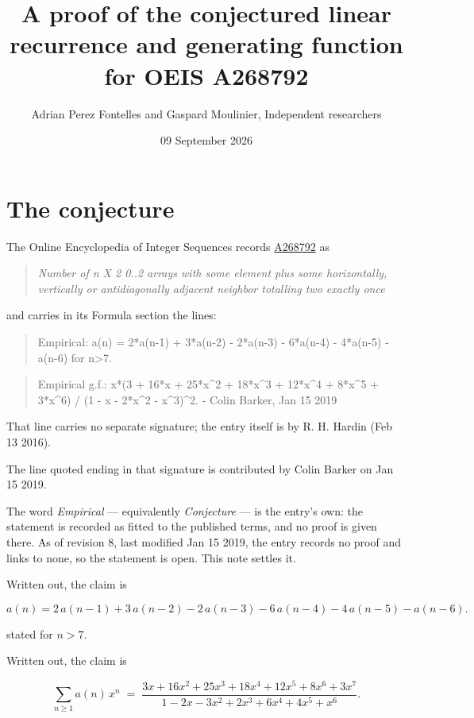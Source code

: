 \documentclass[11pt]{article}
\title{A proof of the conjectured linear recurrence and generating function for OEIS A268792}
\author{Adrian Perez Fontelles and Gaspard Moulinier, Independent researchers}
\date{09 September 2026}
\theoremstyle{definition}
\begin{document}
\maketitle
\section{The conjecture}

The Online Encyclopedia of Integer Sequences records \href{https://oeis.org/A268792}{A268792} as

\begin{quote}\itshape Number of n X 2 0..2 arrays with some element plus some horizontally, vertically or antidiagonally adjacent neighbor totalling two exactly once\end{quote}

and carries in its Formula section the lines:

\begin{quote}\ttfamily Empirical: a(n) = 2*a(n-1) + 3*a(n-2) - 2*a(n-3) - 6*a(n-4) - 4*a(n-5) - a(n-6) for n>7.\end{quote}

\begin{quote}\ttfamily Empirical g.f.: x*(3 + 16*x + 25*x\textasciicircum{}2 + 18*x\textasciicircum{}3 + 12*x\textasciicircum{}4 + 8*x\textasciicircum{}5 + 3*x\textasciicircum{}6) / (1 - x - 2*x\textasciicircum{}2 - x\textasciicircum{}3)\textasciicircum{}2. - Colin Barker, Jan 15 2019\end{quote}

That line carries no separate signature; the entry itself is by R. H. Hardin (Feb 13 2016).

The line quoted ending in that signature is contributed by Colin Barker on Jan 15 2019.

The word {\itshape Empirical} --- equivalently {\itshape Conjecture} --- is the entry's own: the statement is recorded as fitted to the published terms, and no proof is given there. As of revision 8, last modified Jan 15 2019, the entry records no proof and links to none, so the statement is open. This note settles it.

Written out, the claim is

\[a(n) = 2\,a(n-1) + 3\,a(n-2) - 2\,a(n-3) - 6\,a(n-4) - 4\,a(n-5) - a(n-6).\]

stated for $n > 7$.

Written out, the claim is

\[\sum_{n \ge 1} a(n)\,x^n \;=\; \frac{3x + 16x^{2} + 25x^{3} + 18x^{4} + 12x^{5} + 8x^{6} + 3x^{7}}{1 - 2x - 3x^{2} + 2x^{3} + 6x^{4} + 4x^{5} + x^{6}}.\]
\end{document}
